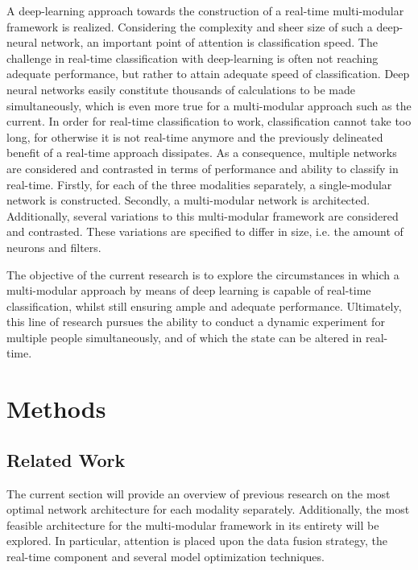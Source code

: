 \documentclass[12pt]{article}
\begin{document}
A deep-learning approach towards the construction of a real-time multi-modular framework is realized. Considering the complexity and sheer size of such a deep-neural network, an important point of attention is classification speed. The challenge in real-time classification with deep-learning is often not reaching adequate performance, but rather to attain adequate speed of classification. Deep neural networks easily constitute thousands of calculations to be made simultaneously, which is even more true for a multi-modular approach such as the current. In order for real-time classification to work, classification cannot take too long, for otherwise it is not real-time anymore and the previously delineated benefit of a real-time approach dissipates. As a consequence, multiple networks are considered and contrasted in terms of performance and ability to classify in real-time. Firstly, for each of the three modalities separately, a single-modular network is constructed. Secondly, a multi-modular network is architected. Additionally, several variations to this multi-modular framework are considered and contrasted. These variations are specified to differ in size, i.e. the amount of neurons and filters. 

The objective of the current research is to explore the circumstances in which a multi-modular approach by means of deep learning is capable of real-time classification, whilst still ensuring ample and adequate performance. Ultimately, this line of research pursues the ability to conduct a dynamic experiment for multiple people simultaneously, and of which the state can be altered in real-time. 

\section{Methods}

\subsection{Related Work} \label{Relatedwork}
The current section will provide an overview of previous research on the most optimal network architecture for each modality separately. Additionally,  the most feasible architecture for the multi-modular framework in its entirety will be explored. In particular, attention is placed upon the data fusion strategy, the real-time component and several model optimization techniques.
\end{document}
